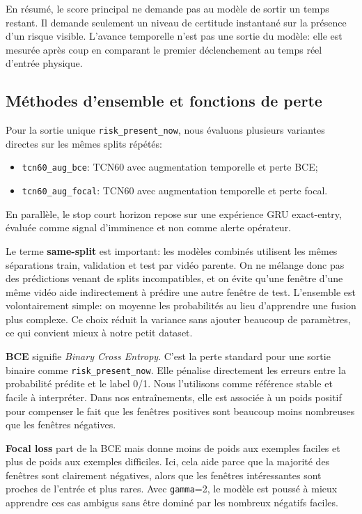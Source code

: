 \documentclass[11pt]{article}
\begin{document}
En résumé, le score principal ne demande pas au modèle de sortir un temps restant. Il demande seulement un niveau de certitude instantané sur la présence d'un risque visible. L'avance temporelle n'est pas une sortie du modèle: elle est mesurée après coup en comparant le premier déclenchement au temps réel d'entrée physique.

\subsection{Méthodes d'ensemble et fonctions de perte}
Pour la sortie unique \texttt{risk\_present\_now}, nous évaluons plusieurs variantes directes sur les mêmes splits répétés:
\begin{itemize}[leftmargin=*]
\item \texttt{tcn60\_aug\_bce}: TCN60 avec augmentation temporelle et perte BCE;
\item \texttt{tcn60\_aug\_focal}: TCN60 avec augmentation temporelle et perte focal.
\end{itemize}
En parallèle, le stop court horizon repose sur une expérience GRU exact-entry, évaluée comme signal d'imminence et non comme alerte opérateur.

Le terme \textbf{same-split} est important: les modèles combinés utilisent les mêmes séparations train, validation et test par vidéo parente. On ne mélange donc pas des prédictions venant de splits incompatibles, et on évite qu'une fenêtre d'une même vidéo aide indirectement à prédire une autre fenêtre de test. L'ensemble est volontairement simple: on moyenne les probabilités au lieu d'apprendre une fusion plus complexe. Ce choix réduit la variance sans ajouter beaucoup de paramètres, ce qui convient mieux à notre petit dataset.

\textbf{BCE} signifie \emph{Binary Cross Entropy}. C'est la perte standard pour une sortie binaire comme \texttt{risk\_present\_now}. Elle pénalise directement les erreurs entre la probabilité prédite et le label 0/1. Nous l'utilisons comme référence stable et facile à interpréter. Dans nos entraînements, elle est associée à un poids positif pour compenser le fait que les fenêtres positives sont beaucoup moins nombreuses que les fenêtres négatives.

\textbf{Focal loss} part de la BCE mais donne moins de poids aux exemples faciles et plus de poids aux exemples difficiles. Ici, cela aide parce que la majorité des fenêtres sont clairement négatives, alors que les fenêtres intéressantes sont proches de l'entrée et plus rares. Avec \texttt{gamma}=2, le modèle est poussé à mieux apprendre ces cas ambigus sans être dominé par les nombreux négatifs faciles.
\end{document}

